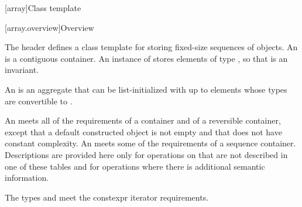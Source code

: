 [array]{Class template }
%

[array.overview]{Overview}

\pnum
{}%
The header  defines a class template for storing fixed-size
sequences of objects.
An  is a contiguous container.
An instance of  stores  elements of type ,
so that  is an invariant.

\pnum
{}%
%
An  is an aggregate that can be
list-initialized with up
to  elements whose types are convertible to .

\pnum
{}%
An  meets all of the requirements of a container and
of a reversible container, except that a default
constructed  object is not empty and that  does not have constant
complexity. An  meets some of the requirements of a sequence
container.
Descriptions are provided here
only for operations on  that are not described in
one of these tables and
for operations where there is additional semantic information.

\pnum
The types  and  meet
the constexpr iterator requirements.

